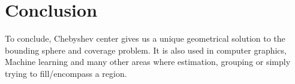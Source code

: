 \documentclass[]{article}
\begin{document}
\section{Conclusion}
To conclude, Chebyshev center gives us a unique geometrical solution to the bounding sphere and coverage problem. It is also used in computer graphics, Machine learning and many other areas where estimation, grouping or simply trying to fill/encompass a region.



\printbibliography[
heading=bibintoc,
title={References}
]
\end{document}
